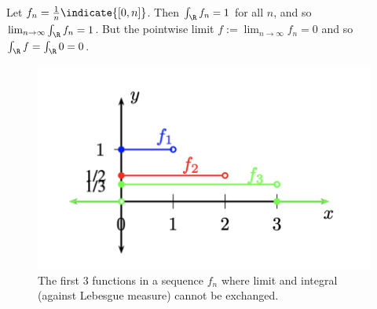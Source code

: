 \documentclass{article} %
\begin{document}
\begin{example}{} Let $f_n = \frac{1}{n} \indicate{[0,n]}$.  Then $\int_{\R} f_n = 1$ for all $n$, and so $\lim_{n \to \infty} \int_{\R} f_n =1$.  But the pointwise limit $f := \lim_{n \to \infty} f_n = 0 $ and so $\int_{\R} f = \int_{\R}  0 = 0$.  %

\begin{figure}[H]
\centering 
\includegraphics[width=.5\textwidth]{images/sequence_of_functions_where_limit_and_integral_cannot_be_exchanged}
\caption{The first 3 functions in a sequence $f_n$ where limit and integral (against Lebesgue measure) cannot be exchanged.}
% 
%  
\end{figure}
\label{ex:a_sequence_where_limits_and_integrals_cannot_be_exchanged}
\end{example}
\end{document}
